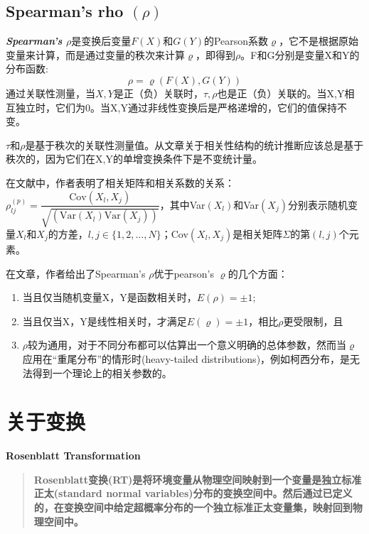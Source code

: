 \subsection{Spearman's rho $(\rho)$}
\emph{\textbf{\textcolor[rgb]{1,0,0}{Spearman's $\rho$}}}是变换后变量$F(X)$和$G(Y)$的Pearson系数$\varrho$\cite{Montes2015}，它不是根据原始变量来计算，而是通过变量的秩次来计算$\varrho$，即得到$\rho$。F和G分别是变量X和Y的分布函数:
\begin{equation}
    \label{eq-rho}
    \rho = \varrho(F(X),G(Y))
\end{equation}
通过关联性测量，当$X,Y$是正（负）关联时，$\tau,\rho$也是正（负）关联的。当X,Y相互独立时，它们为0。当X,Y通过非线性变换后是严格递增的，它们的值保持不变。

\textcolor[rgb]{1,0,0}{$\tau$和$\rho$是基于秩次的关联性测量值。从文章\cite{Genest2007}关于相关性结构的统计推断应该总是基于秩次的，因为它们在X,Y的单增变换条件下是不变统计量。}


在文献\cite{Deligiannis2012}中，作者表明了相关矩阵和相关系数的关系：$\rho_{lj}^{(p)} = \dfrac{\text{Cov}(X_l,X_j)}{\sqrt{\left(\text{Var}(X_l)\text{Var}(X_j)\right)}}$，其中Var$(X_l)$和Var$(X_j)$分别表示随机变量$X_l$和$X_j$的方差，$l,j \in \{1,2,\dots,N\}$；Cov$(X_l,X_j)$是相关矩阵$\Sigma$的第$(l,j)$个元素。

在文章\cite{Genest2007}，作者给出了Spearman's $\rho$优于pearson's $\varrho$的几个方面：
\begin{enumerate}[1.]
    \item 当且仅当随机变量X，Y是函数相关时，$E(\rho) = \pm 1$;
    \item 当且仅当X，Y是线性相关时，才满足$E(\varrho) = \pm 1$，相比$\rho$更受限制，且
    \item $\rho$较为通用，对于不同分布都可以估算出一个意义明确的总体参数，然而当$\varrho$应用在``重尾分布''的情形时(heavy-tailed distributions)，例如柯西分布，是无法得到一个理论上的相关参数的。
\end{enumerate}







\section{关于变换}
\textbf{\textcolor[rgb]{1,0,0}{Rosenblatt Transformation}}
\begin{quotation}
    \textbf{\textcolor[rgb]{1,0,0}{Rosenblatt变换(RT)是将环境变量从物理空间映射到一个变量是独立标准正太(standard normal variables)分布的变换空间中。然后通过已定义的，在变换空间中给定超概率分布的一个独立标准正太变量集，映射回到物理空间中。}}\cite{Montes2015}
\end{quotation}



